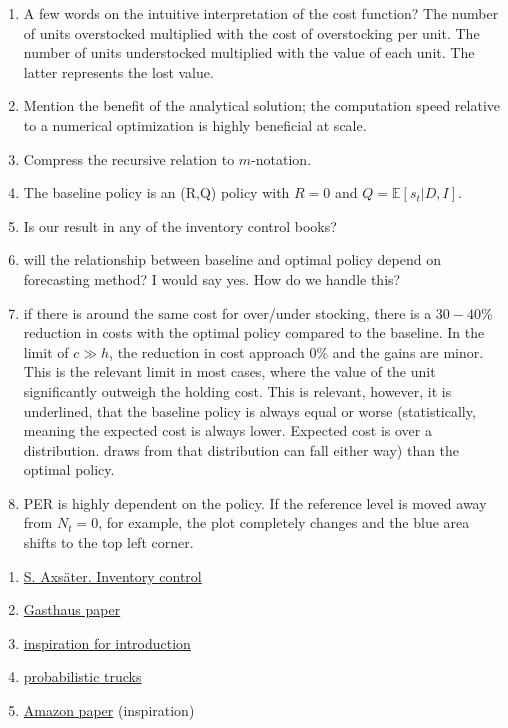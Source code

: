 \begin{enumerate}
	\item A few words on the intuitive interpretation of the cost function? The number of units overstocked multiplied with the cost of overstocking per unit. The number of units understocked multiplied with the value of each unit. The latter represents the lost value.
	\item Mention the benefit of the analytical solution; the computation speed relative to a numerical optimization is highly beneficial at scale.
	\item Compress the recursive relation to $m$-notation. 
	\item The baseline policy is an (R,Q) policy with $R =0$ and $Q = \mathbb{E}[s_t|D,I]$.
	\item Is our result in any of the inventory control books?
	\item will the relationship between baseline and optimal policy depend on forecasting method? I would say yes. How do we handle this?
	
	\item if there is around the same cost for over/under stocking, there is a $30-40\%$ reduction in costs with the optimal policy compared to the baseline. In the limit of $c\gg h$, the reduction in cost approach $0\%$ and the gains are minor. This is the relevant limit in most cases, where the value of the unit significantly outweigh the holding cost. This is relevant, however, it is underlined, that the baseline policy is always equal or worse (statistically, meaning the expected cost is always lower. Expected cost is over a distribution. draws from that distribution can fall either way) than the optimal policy. 
	
	\item PER is highly dependent on the policy. If the reference level is moved away from $N_t =0$, for example, the plot completely changes and the blue area shifts to the top left corner.
\end{enumerate}

\begin{enumerate}
	\item \href{https://www.academia.edu/27965536/Inventorycontroltextbook_140429044831_phpapp02_1_}{S. Axsäter. Inventory control}
	\item \href{https://proceedings.mlr.press/v151/kan22a/kan22a.pdf}{Gasthaus paper}
	\item \href{https://arxiv.org/pdf/2012.02392}{inspiration for introduction}
	\item \href{https://arxiv.org/pdf/2310.17168}{probabilistic trucks}
	\item \href{https://arxiv.org/pdf/2310.16096}{Amazon paper} (inspiration)
\end{enumerate}